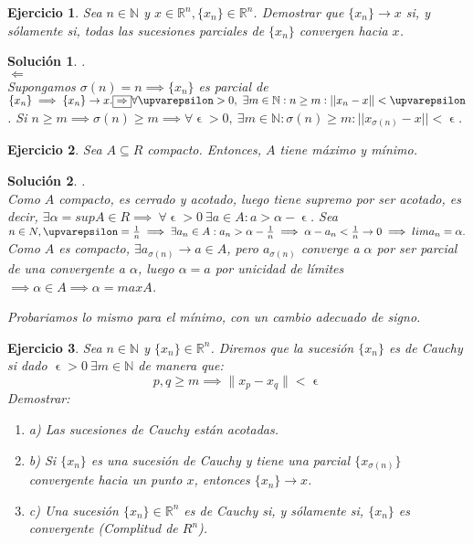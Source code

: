\documentclass[11pt, a4paper]{article}
\newif\IfInSansMode
\let\epsilon\upvarepsilon
\newcommand{\R}{\mathbb{R}} \newcommand{\N}{\mathbb{N}}
\theoremstyle{theorem-style}
\theoremstyle{definition-style}
\newtheorem{ejer}{Ejercicio}[section]
\theoremstyle{remark-style}
\newtheorem*{sol}{Solución}
\theoremstyle{example-style}
\newenvironment{nlist}
{\begin{enumerate}
    \renewcommand\labelenumi{(\emph{\roman{enumi})}}}
  {\end{enumerate}}
\begin{document}
\begin{ejer}
Sea $n \in \N$ y $x \in \R^n, \{x_n\} \in \R^n$. Demostrar que $\{x_n\} \rightarrow x$ si, y sólamente si, todas las sucesiones parciales de $\{x_n\}$ convergen hacia $x$. 
\end{ejer}

\begin{sol}.
\\ $\boxed{\Leftarrow}$ \\ Supongamos $ \sigma(n)=n \implies \{x_n\} $ es parcial de $ \{x_n\} \implies \{x_n\} \rightarrow x. \\
 \boxed{\Rightarrow} \\ \forall \epsilon > 0, \ \exists m \in \N: n \ge m: ||x_n-x|| < \epsilon$. Si $n \ge m \implies \sigma(n) \ge m \implies \forall \epsilon > 0, \ \exists m \in \N: \sigma(n) \ge m: ||x_{\sigma(n)}-x|| < \epsilon$.
\end{sol}

\begin{ejer}
Sea $A \subseteq R$ compacto. Entonces, $A$ tiene máximo y mínimo.
\end{ejer}

\begin{sol}.
\\ Como $A$ compacto, es cerrado y acotado, luego tiene supremo por ser acotado, es decir, $ \exists \alpha = sup A \in R \implies \ \forall \epsilon > 0 \ \exists a \in A: a > \alpha - \epsilon$. Sea $ n \in N, \epsilon = \frac{1}{n} \implies \exists a_n \in A: a_n > \alpha - \frac{1}{n} \implies \alpha - a_n < \frac{1}{n} \rightarrow 0 \implies lim a_n = \alpha. \\
$Como $A$ es compacto, $ \exists a_{\sigma(n)} \rightarrow a \in A$, pero $a_{\sigma(n)}	$ converge a $\alpha$ por ser parcial de una convergente a $\alpha$, luego $\alpha = a$ por unicidad de límites $\implies \alpha \in A \implies \alpha = max A$.

Probariamos lo mismo para el mínimo, con un cambio adecuado de signo.
\end{sol}

\begin{ejer}
Sea $n \in \N$ y $\{x_n\} \in \R^n$. Diremos que la
sucesión $\{x_n\}$ es de Cauchy si dado $\epsilon > 0 \ \exists m \in \N$ de manera que: $$ p,q \ge m \implies \|x_p-x_q\| < \epsilon$$
Demostrar: \\
 \begin{nlist}
\item a) Las sucesiones de Cauchy están acotadas. \\
\item b) Si $\{x_n\}$ es una sucesión de Cauchy y tiene una parcial $\{x_{\sigma(n)}\}$ convergente hacia un punto $x$, entonces $\{x_n\} \rightarrow x$. \\
\item c) Una sucesión $\{x_n\} \in \R^n $ es de Cauchy si, y sólamente si, $\{x_n\}$ es convergente (Complitud de $R^n$).
\end{nlist}
\end{ejer}
\end{document}
